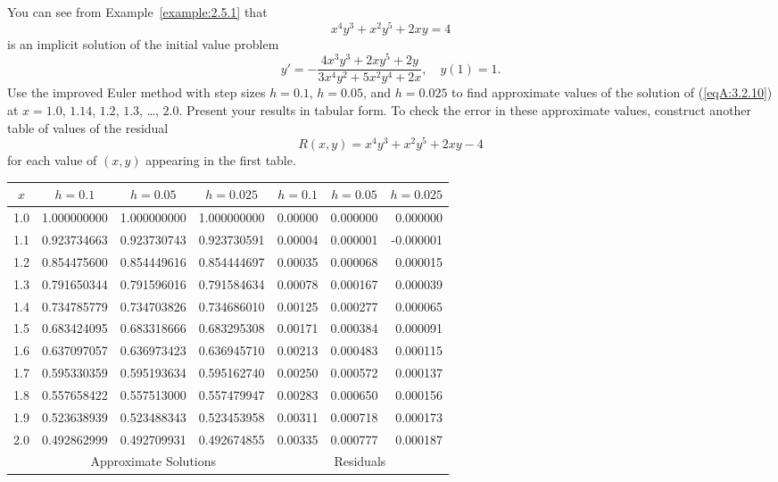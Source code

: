 \documentclass{ximera}
\begin{document}
\begin{problem}\label{exer:3.2.10} 
You can see from Example~\ref{example:2.5.1} that
$$
x^4y^3+x^2y^5+2xy=4
$$
is an implicit solution of  the initial value problem
\begin{equation}\label{eqA:3.2.10}
y'=-\frac{4x^3y^3+2xy^5+2y}{3x^4y^2+5x^2y^4+2x},\quad y(1)=1.
\end{equation}
Use the improved Euler method with step sizes $h=0.1$, $h=0.05$, and
$h=0.025$ to find approximate values of the solution of (\ref{eqA:3.2.10}) at
$x=1.0$, $1.14$, $1.2$, $1.3$, \dots, $2.0$. Present your results in
tabular form. To
check the error in these approximate values, construct another table
of values of the residual
$$
R(x,y)=x^4y^3+x^2y^5+2xy-4
$$
for each value of $(x,y)$ appearing in the first table.

\begin{solution}
    {\small
\begin{tabular}{|c|r|r|r|r|r|r|}\hline
\multicolumn{1}{|c|}{$x$}&
\multicolumn{1}{|c|}{$h=0.1$}&
\multicolumn{1}{|c|}{$h=0.05$}&
\multicolumn{1}{|c|}{$h=0.025$}&
\multicolumn{1}{|c|}{$h=0.1$}&
\multicolumn{1}{|c|}{$h=0.05$}&
\multicolumn{1}{|c|}{$h=0.025$}\\ \hline
1.0 & 1.000000000 & 1.000000000 & 1.000000000 &0.00000 & 0.000000 &  0.000000  \\
1.1 & 0.923734663 & 0.923730743 & 0.923730591 &0.00004 & 0.000001 & -0.000001  \\
1.2 & 0.854475600 & 0.854449616 & 0.854444697 &0.00035 & 0.000068 &  0.000015  \\
1.3 & 0.791650344 & 0.791596016 & 0.791584634 &0.00078 & 0.000167 &  0.000039  \\
1.4 & 0.734785779 & 0.734703826 & 0.734686010 &0.00125 & 0.000277 &  0.000065  \\
1.5 & 0.683424095 & 0.683318666 & 0.683295308 &0.00171 & 0.000384 &  0.000091  \\
1.6 & 0.637097057 & 0.636973423 & 0.636945710 &0.00213 & 0.000483 &  0.000115  \\
1.7 & 0.595330359 & 0.595193634 & 0.595162740 &0.00250 & 0.000572 &  0.000137  \\
1.8 & 0.557658422 & 0.557513000 & 0.557479947 &0.00283 & 0.000650 &  0.000156  \\
1.9 & 0.523638939 & 0.523488343 & 0.523453958 &0.00311 & 0.000718 &  0.000173  \\
2.0 & 0.492862999 & 0.492709931 & 0.492674855 &0.00335 & 0.000777 &  0.000187  \\
\hline
&\multicolumn{3}{c|}{Approximate Solutions}&
\multicolumn{3}{c|}{Residuals}\\\hline
\end{tabular}}
\end{solution}
\end{problem}
\end{document}
